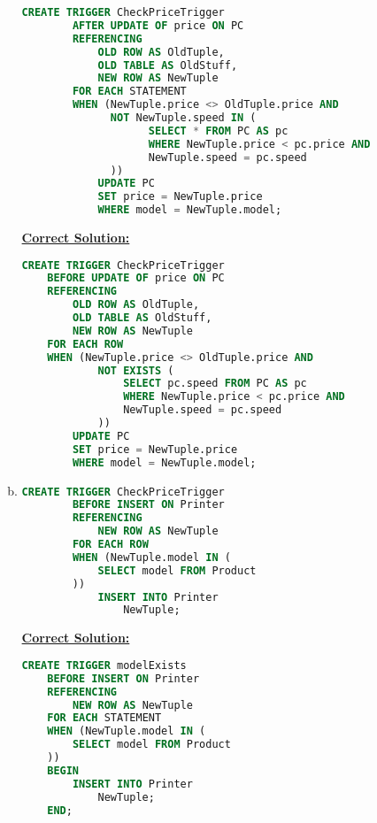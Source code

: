 \documentclass[12pt]{article}
\begin{document}
\begin{enumerate}[1.]
\begin{enumerate}[a)]
        \begin{lstlisting}[language=SQL]
        CREATE TRIGGER CheckPriceTrigger
        AFTER UPDATE OF price ON PC
        REFERENCING
            OLD ROW AS OldTuple,
            OLD TABLE AS OldStuff,
            NEW ROW AS NewTuple
        FOR EACH STATEMENT
        WHEN (NewTuple.price <> OldTuple.price AND
              NOT NewTuple.speed IN (
                    SELECT * FROM PC AS pc
                    WHERE NewTuple.price < pc.price AND
                    NewTuple.speed = pc.speed
              ))
            UPDATE PC
            SET price = NewTuple.price
            WHERE model = NewTuple.model;
        \end{lstlisting}

        \bigskip

        \begin{mdframed}
            \underline{\textbf{Correct Solution:}}

    \begin{lstlisting}[language=SQL]
    CREATE TRIGGER CheckPriceTrigger
    BEFORE UPDATE OF price ON PC
    REFERENCING
        OLD ROW AS OldTuple,
        OLD TABLE AS OldStuff,
        NEW ROW AS NewTuple
    FOR EACH ROW
    WHEN (NewTuple.price <> OldTuple.price AND
            NOT EXISTS (
                SELECT pc.speed FROM PC AS pc
                WHERE NewTuple.price < pc.price AND
                NewTuple.speed = pc.speed
            ))
        UPDATE PC
        SET price = NewTuple.price
        WHERE model = NewTuple.model;
    \end{lstlisting}
        \end{mdframed}

        \item

        \begin{lstlisting}[language=SQL]
        CREATE TRIGGER CheckPriceTrigger
        BEFORE INSERT ON Printer
        REFERENCING
            NEW ROW AS NewTuple
        FOR EACH ROW
        WHEN (NewTuple.model IN (
            SELECT model FROM Product
        ))
            INSERT INTO Printer
                NewTuple;
        \end{lstlisting}

        \bigskip

        \begin{mdframed}
            \underline{\textbf{Correct Solution:}}

            \bigskip

    \begin{lstlisting}[language=SQL]
    CREATE TRIGGER modelExists
    BEFORE INSERT ON Printer
    REFERENCING
        NEW ROW AS NewTuple
    FOR EACH STATEMENT
    WHEN (NewTuple.model IN (
        SELECT model FROM Product
    ))
    BEGIN
        INSERT INTO Printer
            NewTuple;
    END;
    \end{lstlisting}



\end{mdframed}
\end{enumerate}
\end{enumerate}
\end{document}
